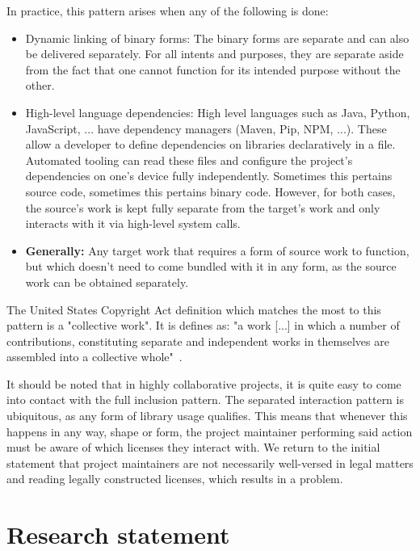 \begin{itemize}
	In practice, this pattern arises when any of the following is done:
	
	\begin{itemize}
		\item Dynamic linking of binary forms: The binary forms are separate and can also be delivered separately. For all intents and purposes, they are separate aside from the fact that one cannot function for its intended purpose without the other.
		\item High-level language dependencies: High level languages such as Java, Python, JavaScript, ... have dependency managers (Maven, Pip, NPM, ...). These allow a developer to define dependencies on libraries declaratively in a file. Automated tooling can read these files and configure the project's dependencies on one's device fully independently. Sometimes this pertains source code, sometimes this pertains binary code. However, for both cases, the source's work is kept fully separate from the target's work and only interacts with it via high-level system calls.
		\item \textbf{Generally:} Any target work that requires a form of source work to function, but which doesn't need to come bundled with it in any form, as the source work can be obtained separately.
	\end{itemize}
	
	The United States Copyright Act definition which matches the most to this pattern is a "collective work". It is defines as: "a work [...] in which a number of contributions, constituting separate and independent works in themselves are assembled into a collective whole"~\cite{us-copyright-law-definitions,5070520}.
\end{itemize}

It should be noted that in highly collaborative projects, it is quite easy to come into contact with the full inclusion pattern. The separated interaction pattern is ubiquitous, as any form of library usage qualifies. This means that whenever this happens in any way, shape or form, the project maintainer performing said action must be aware of which licenses they interact with. We return to the initial statement that project maintainers are not necessarily well-versed in legal matters and reading legally constructed licenses, which results in a problem.

\section{Research statement}


